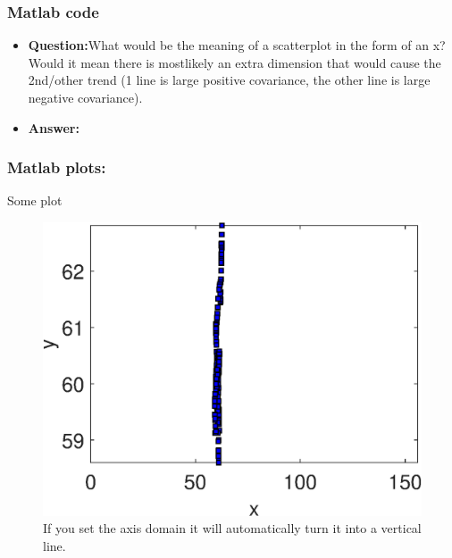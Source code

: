 \subsubsection*{Matlab code}
\newpage


\begin{itemize}
    \item \textbf{Question:}What would be the meaning of a scatterplot in the form of an x? Would it mean there is mostlikely an extra dimension that would cause the 2nd/other trend (1 line is large positive covariance, the other line is large negative covariance).
    \item \textbf{Answer:}
\end{itemize}
\subsubsection{Matlab plots:}
Some plot
\begin{figure}[h!]
    \centering
    \includegraphics{images/matlabEx1/verticalLine}
    \caption{If you set the axis domain it will automatically turn it into a vertical line.}
    \label{fig:vertical_line}
\end{figure}
